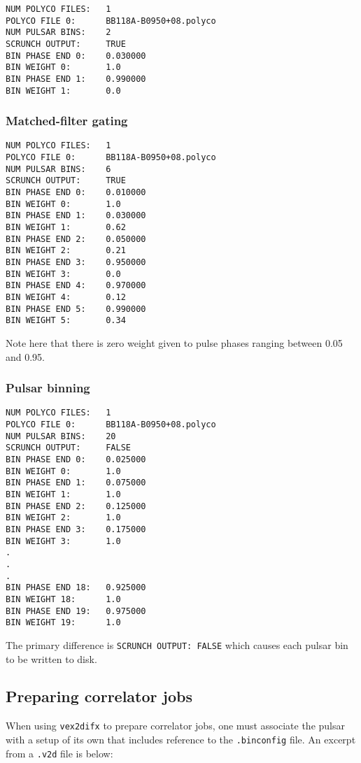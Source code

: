 \begin{verbatim}
NUM POLYCO FILES:   1
POLYCO FILE 0:      BB118A-B0950+08.polyco
NUM PULSAR BINS:    2
SCRUNCH OUTPUT:     TRUE
BIN PHASE END 0:    0.030000
BIN WEIGHT 0:       1.0
BIN PHASE END 1:    0.990000
BIN WEIGHT 1:       0.0
\end{verbatim}

\subsubsection{Matched-filter gating}

\begin{verbatim}
NUM POLYCO FILES:   1
POLYCO FILE 0:      BB118A-B0950+08.polyco
NUM PULSAR BINS:    6
SCRUNCH OUTPUT:     TRUE
BIN PHASE END 0:    0.010000
BIN WEIGHT 0:       1.0
BIN PHASE END 1:    0.030000
BIN WEIGHT 1:       0.62
BIN PHASE END 2:    0.050000
BIN WEIGHT 2:       0.21
BIN PHASE END 3:    0.950000
BIN WEIGHT 3:       0.0
BIN PHASE END 4:    0.970000
BIN WEIGHT 4:       0.12
BIN PHASE END 5:    0.990000
BIN WEIGHT 5:       0.34
\end{verbatim}

Note here that there is zero weight given to pulse phases ranging between 0.05 and 0.95.

\subsubsection{Pulsar binning}

\begin{verbatim}
NUM POLYCO FILES:   1
POLYCO FILE 0:      BB118A-B0950+08.polyco
NUM PULSAR BINS:    20
SCRUNCH OUTPUT:     FALSE
BIN PHASE END 0:    0.025000
BIN WEIGHT 0:       1.0
BIN PHASE END 1:    0.075000
BIN WEIGHT 1:       1.0
BIN PHASE END 2:    0.125000
BIN WEIGHT 2:       1.0
BIN PHASE END 3:    0.175000
BIN WEIGHT 3:       1.0
.
.
.
BIN PHASE END 18:   0.925000
BIN WEIGHT 18:      1.0
BIN PHASE END 19:   0.975000
BIN WEIGHT 19:      1.0
\end{verbatim}

The primary difference is {\tt SCRUNCH OUTPUT:     FALSE} which causes each pulsar bin to be written to disk.

\subsection{Preparing correlator jobs}

When using {\tt vex2difx} to prepare correlator jobs, one must associate the pulsar with a setup of its own that includes reference to the {\tt .binconfig} file.
An excerpt from a {\tt .v2d} file is below:

